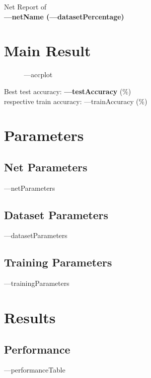 \documentclass[11pt]{article}
\begin{document}
\begin{center}
    \Large{Net Report of  \\
    \textbf{---netName (---datasetPercentage)}}
\end{center}

\section{Main Result}
\begin{figure}[H]
    \centering
    ---accplot
\end{figure}
\begin{center}
    \large {Best test accuracy: \textbf{---testAccuracy} ($\%$)} \\
    \large {respective train accuracy: ---trainAccuracy ($\%$)} \\
\end{center}
\section{Parameters}
\subsection{Net Parameters}

\begin{table}[H]
    \centering
    ---netParameters
\end{table}
    
    
\subsection{Dataset Parameters}
\begin{table}[H]
    \centering
    ---datasetParameters
\end{table}

\subsection{Training Parameters}
\begin{table}[H]
    \centering
    ---trainingParameters
    \end{table}


\section{Results}
\subsection{Performance}
\begin{table}[H]
    \centering
        ---performanceTable
\end{table}
\end{document}
